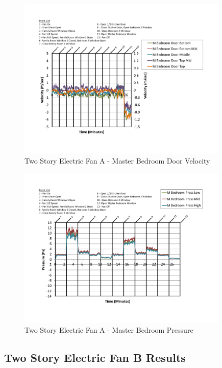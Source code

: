 \documentclass{article}
\begin{document}
\begin{appendices}
	\begin{figure}[H]
		\centering
		\includegraphics[height=3.05in,trim=0.67in 1.1in 0.67in 0.8in,clip=true]{0_Images/Results_Charts/ColdFlow/Two_Story/Electric/A/Master_Bedroom_Door_Velocity.pdf}
		\caption{Two Story Electric Fan A - Master Bedroom Door Velocity}
	\end{figure}
 

	\begin{figure}[H]
		\centering
		\includegraphics[height=3.05in,trim=0.67in 1.1in 0.67in 0.8in,clip=true]{0_Images/Results_Charts/ColdFlow/Two_Story/Electric/A/Master_Bedroom_Pressure.pdf}
		\caption{Two Story Electric Fan A - Master Bedroom Pressure}
	\end{figure}
 
	\clearpage

		\clearpage
\clearpage		\large
\subsection{Two Story Electric Fan B Results} \label{App:Two_StoryElectricFanBResults} 


\end{appendices}
\end{document}
